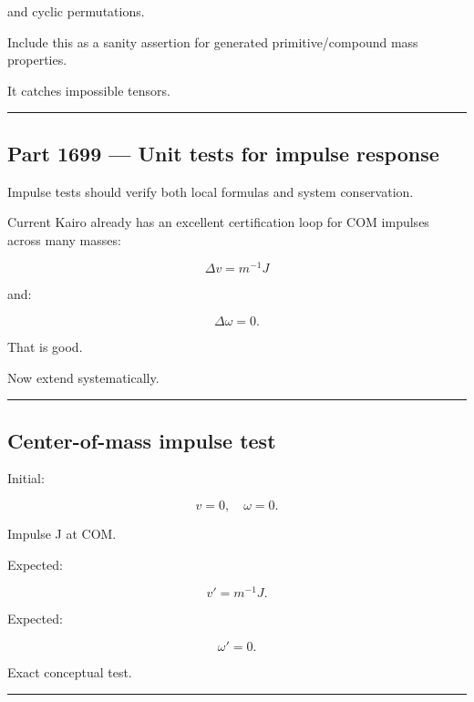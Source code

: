 and cyclic permutations.

Include this as a sanity assertion for generated primitive/compound mass properties.

It catches impossible tensors.

\begin{center}\rule{0.5\linewidth}{0.5pt}\end{center}

\subsection{Part 1699 --- Unit tests for impulse response}\label{06-engine-ii-ch039-part-1699-unit-tests-for-impulse-response}

\hypertarget{06-engine-ii-ch039-part-1699-unit-tests-for-impulse-response}{}

Impulse tests should verify both local formulas and system conservation.

Current Kairo already has an excellent certification loop for COM impulses across many masses:

\[
\Delta v
=
m^{-1}J
\]

and:

\[
\Delta\omega=0.
\]

That is good.

Now extend systematically.

\begin{center}\rule{0.5\linewidth}{0.5pt}\end{center}

\subsection{Center-of-mass impulse test}\label{06-engine-ii-ch039-center-of-mass-impulse-test}

\hypertarget{06-engine-ii-ch039-center-of-mass-impulse-test}{}

Initial:

\[
v=0,
\quad
\omega=0.
\]

Impulse J at COM.

Expected:

\[
v'=m^{-1}J.
\]

Expected:

\[
\omega'=0.
\]

Exact conceptual test.

\begin{center}\rule{0.5\linewidth}{0.5pt}\end{center}

